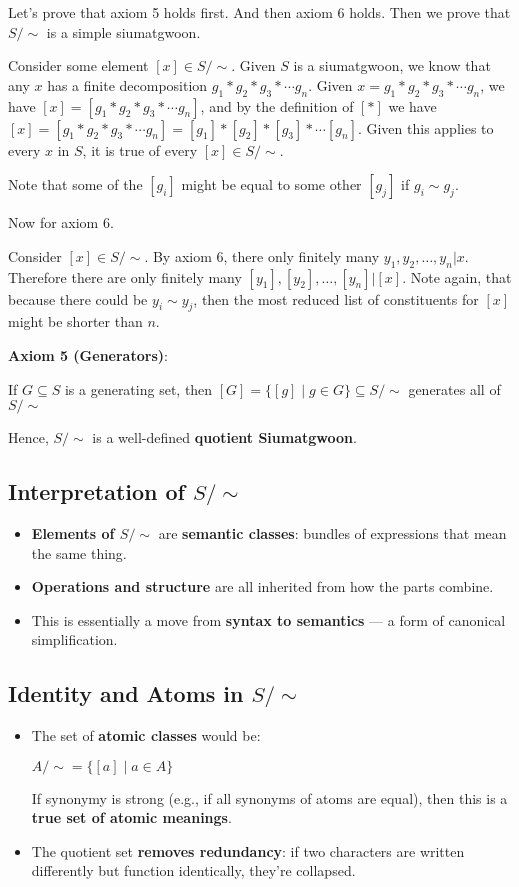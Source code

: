 Let's prove that axiom 5 holds first. And then axiom 6 holds. Then we prove that $S/\sim$ is a simple siumatgwoon.

Consider some element $[x] \in S/\sim$. Given $S$ is a siumatgwoon, we know that any $x$ has a finite decomposition $g_1 * g_2 * g_3 * \cdots g_n$. Given $x=g_1 * g_2 * g_3 * \cdots g_n$, we have $[x]=[g_1 * g_2 * g_3 * \cdots g_n]$, and by the definition of $[*]$ we have $[x]=[g_1 * g_2 * g_3 * \cdots g_n]=[g_1] * [g_2] * [g_3] * \cdots [g_n]$. Given this applies to every $x$ in $S$, it is true of every $[x]\in S/\sim$. 

Note that some of the $[g_i]$ might be equal to some other $[g_j]$ if $g_i \sim g_j$.

Now for axiom 6.

Consider $[x]\in S/\sim$. By axiom 6, there only finitely many $y_1, y_2, \ldots, y_n | x.$ Therefore there are only finitely many $[y_1], [y_2], \ldots, [y_n] | [x].$ Note again, that because there could be $y_i \sim y_j$, then the most reduced list of constituents for $[x]$ might be shorter than $n$.

\textbf{Axiom 5 (Generators)}:

If $G\subseteq S$ is a generating set, then $[G]=\{[g]\mid g\in G\}\subseteq S/\sim$ generates all of $S/\sim$

Hence, $S/\sim$ is a well-defined \textbf{quotient Siumatgwoon}.

\subsection{Interpretation of $S/\sim$}

\begin{itemize}
\item \textbf{Elements of $S/\sim$} are \textbf{semantic classes}: bundles of expressions that mean the same thing.
\item \textbf{Operations and structure} are all inherited from how the parts combine.
\item This is essentially a move from \textbf{syntax to semantics} — a form of canonical simplification.
\end{itemize}

\subsection{Identity and Atoms in $S/\sim$}

\begin{itemize}
\item The set of \textbf{atomic classes} would be:

$A/\sim=\{[a]\mid a\in A\}$

If synonymy is strong (e.g., if all synonyms of atoms are equal), then this is a \textbf{true set of atomic meanings}.

\item The quotient set \textbf{removes redundancy}: if two characters are written differently but function identically, they're collapsed.
\end{itemize}

